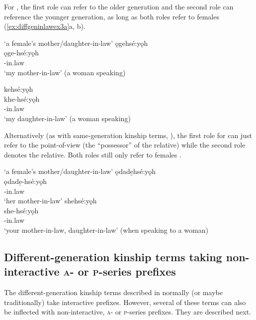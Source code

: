 For , the first role can refer to the older generation and the second role can reference the younger generation, as long as both roles refer to females (\ref{ex:diffgeninlawex3a}a, b).

\ea\label{ex:diffgeninlawex3a}  ‘a female’s mother/daughter-in-law’
\ea ǫgehsé:yǫh\\
\gll ǫge-hsé:yǫh\\
-in.law\\
\glt ‘my mother-in-law’ (a woman speaking)

\ex kehsé:yǫh\\
\gll khe-hsé:yǫh\\
-in.law\\
\glt ‘my daughter-in-law’ (a woman speaking)
\z
\z

Alternatively (as with same-generation kinship terms, ), the first role for  can just refer to the point-of-view (the “possessor” of the relative) while the second role denotes the relative. Both roles still only refer to females .

\ea\label{ex:diffgeninlawex3b}  ‘a female’s mother/daughter-in-law’
\ea ǫdade̱hsé:yǫh\\
\gll ǫdade̱-hsé:yǫh\\
 -in.law\\
\glt `her mother-in-law'
\ex shehsé:yǫh \\
\gll she-hsé:yǫh\\
-in.law\\
\glt ‘your mother-in-law, daughter-in-law' (when speaking to a woman)
\z
\z

\subsection{Different-generation kinship terms taking non-interactive \textsc{a}- or \textsc{p}-series prefixes} \label{ch:Different-generation kinship terms taking non-interactive a or o series pronominal prefixes}
The different-generation kinship terms described in  normally (or maybe traditionally) take interactive prefixes. However, several of these terms can also be inflected with non-interactive, \textsc{a}- or \textsc{p}-series prefixes. They are described next.


